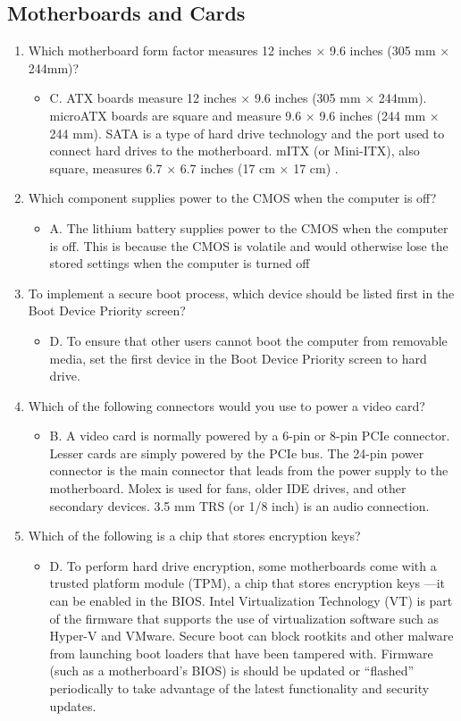 \documentclass{article}
\begin{document}
\subsection{Motherboards and Cards} 
\begin{enumerate}
    \item Which motherboard form factor measures 12
inches × 9.6 inches (305 mm × 244mm)?
    \begin{itemize}
        \item C. ATX boards measure 12 inches × 9.6 inches
(305 mm × 244mm). microATX boards are square
and measure 9.6 × 9.6 inches (244 mm × 244
mm). SATA is a type of hard drive technology and
the port used to connect hard drives to the
motherboard. mITX (or Mini-ITX), also square,
measures 6.7 × 6.7 inches (17 cm × 17 cm) . 
    \end{itemize}
    \item Which component supplies power to the CMOS
when the computer is off?
    \begin{itemize}
        \item A. The lithium battery supplies power to the
CMOS when the computer is off. This is because
the CMOS is volatile and would otherwise lose the
stored settings when the computer is turned off
    \end{itemize}
    \item To implement a secure boot process, which device
should be listed first in the Boot Device Priority
screen?
    \begin{itemize}
        \item D. To ensure that other users cannot boot the
computer from removable media, set the first
device in the Boot Device Priority screen to hard
drive.
    \end{itemize}
    \item Which of the following connectors would you use
to power a video card?
    \begin{itemize}
        \item B. A video card is normally powered by a 6-pin or
8-pin PCIe connector. Lesser cards are simply
powered by the PCIe bus. The 24-pin power
connector is the main connector that leads from
the power supply to the motherboard. Molex is
used for fans, older IDE drives, and other
secondary devices. 3.5 mm TRS (or 1/8 inch) is an
audio connection.
    \end{itemize}
    \item Which of the following is a chip that stores
encryption keys?
    \begin{itemize}
        \item D. To perform hard drive encryption, some
motherboards come with a trusted platform
module (TPM), a chip that stores encryption keys
—it can be enabled in the BIOS. Intel
Virtualization Technology (VT) is part of the
firmware that supports the use of virtualization
software such as Hyper-V and VMware. Secure
boot can block rootkits and other malware from
launching boot loaders that have been tampered
with. Firmware (such as a motherboard’s BIOS) is
should be updated or “flashed” periodically to take
advantage of the latest functionality and security
updates.
    \end{itemize}
\end{enumerate}
\end{document}
